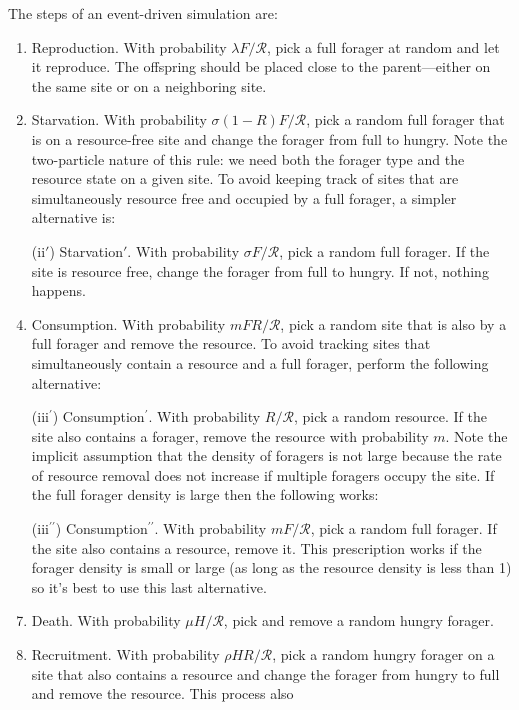 \documentclass[11pt]{iopart}
\begin{document}
The steps of an event-driven simulation are:
\begin{enumerate}
\item Reproduction.  With probability $\lambda F/\mathcal{R}$, pick a full
  forager at random and let it reproduce.  The offspring should be placed
  close to the parent---either on the same site or on a neighboring site.
\item Starvation.  With probability $\sigma(1-R)F/\mathcal{R}$, pick a random
  full forager that is on a resource-free site and change the forager from
  full to hungry.  Note the two-particle nature of this rule: we need both
  the forager type and the resource state on a given site.  To avoid keeping
  track of sites that are simultaneously resource free and occupied by a full
  forager, a simpler alternative is:
\item[(ii$'$)] Starvation$'$.  With probability $\sigma F/\mathcal{R}$, pick a
  random full forager.  If the site is resource free, change the forager from
  full to hungry.  If not, nothing happens.
\item Consumption.  With probability $mFR/\mathcal{R}$, pick a random site
  that is also by a full forager and remove the resource.  To avoid tracking
  sites that simultaneously contain a resource and a full forager, perform
  the following alternative:
\item[(iii$^\prime$)] Consumption$^\prime$.  With probability
  $R/\mathcal{R}$, pick a random resource.  If the site also contains a
  forager, remove the resource with probability $m$.  Note the implicit
  assumption that the density of foragers is not large because the rate of
  resource removal does not increase if multiple foragers occupy the site.
  If the full forager density is large then the following works:
\item[(iii$^{\prime\prime}$)] Consumption$^{\prime\prime}$.  With probability
  $m F/\mathcal{R}$, pick a random full forager.  If the site also contains a
  resource, remove it.  This prescription works if the forager density is
  small or large (as long as the resource density is less than 1) so it's
  best to use this last alternative.
\item Death.  With probability $\mu H/\mathcal{R}$, pick and remove a random
  hungry forager.
\item Recruitment.  With probability $\rho HR/\mathcal{R}$, pick a random
  hungry forager on a site that also contains a resource and change the
  forager from hungry to full and remove the resource.  This process also

\end{enumerate}
\end{document}
